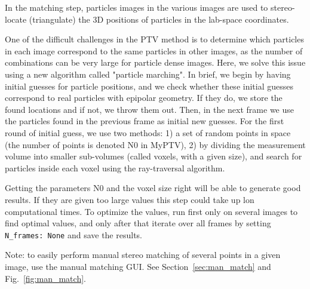 \documentclass[10pt,a4paper]{article}
\begin{document}
In the matching step, particles images in the various images are used to stereo-locate (triangulate) the 3D positions of particles in the lab-space coordinates. 

One of the difficult challenges in the PTV method is to determine which particles in each image correspond to the same particles in other images, as the number of combinations can be very large for particle dense images. Here, we solve this issue using a new algorithm called "particle marching". In brief, we begin by having initial guesses for particle positions, and we check whether these initial guesses correspond to real particles with epipolar geometry. If they do, we store the found locations and if not, we throw them out. Then, in the next frame we use the particles found in the previous frame as initial new guesses. For the first round of initial guess, we use two methods: 1) a set of random points in space (the number of points is denoted N0 in MyPTV), 2) by dividing the measurement volume into smaller sub-volumes (called voxels, with a given size), and search for particles inside each voxel using the ray-traversal algorithm.
     

Getting the parameters N0 and the voxel size right will be able to generate good results. If they are given too large values this step could take up lon computational times. To optimize the values, run first only on several images to find optimal values, and only after that iterate over all frames by setting \texttt{N\_frames: None} and save the results. 


Note: to easily perform manual stereo matching of several points in a given image, use the manual matching GUI. See Section~\ref{sec:man_match} and Fig.~\ref{fig:man_match}.
\end{document}
